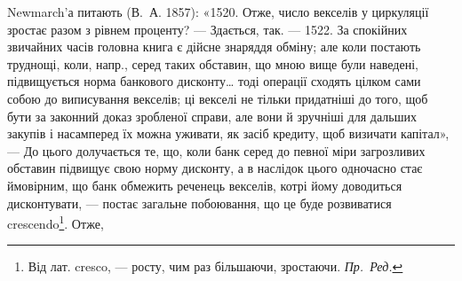 Newmarch’а питають (В.~А. 1857): «1520. Отже, число векселів у циркуляції
зростає разом з рівнем проценту? — Здається, так. — 1522. За спокійних
звичайних часів головна книга є дійсне знаряддя обміну; але коли постають
труднощі, коли, напр., серед таких обставин, що мною вище були наведені, підвищується
норма банкового дисконту\dots{} тоді операції сходять цілком сами собою
до виписування векселів; ці векселі не тільки придатніші до того, щоб бути за
законний доказ зробленої справи, але вони й зручніші для дальших закупів
і насамперед їх можна уживати, як засіб кредиту, щоб визичати капітал», —
До цього долучається те, що, коли банк серед до певної міри загрозливих обставин
підвищує свою норму дисконту, а в наслідок цього одночасно стає ймовірним,
що банк обмежить реченець векселів, котрі йому доводиться дисконтувати,
— постає загальне побоювання, що це буде розвиватися crescendo\footnote{
Від лат. cresco, — росту, чим раз більшаючи, зростаючи. \emph{Пр.~Ред.}
}. Отже,
\parbreak{}  %
